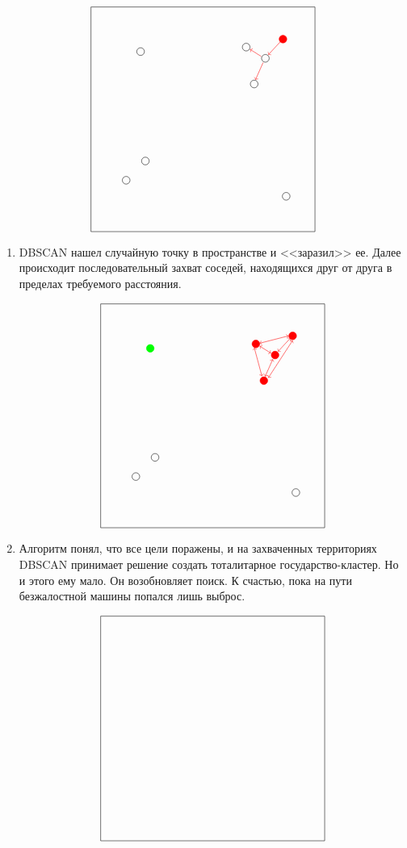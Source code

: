\[
\begin{tikzpicture}
    \draw (-3.5, 3.5) -- (3.5, 3.5);
    \draw (-3.5, -3.5) -- (3.5, -3.5);
    \draw (-3.5, -3.5) -- (-3.5, 3.5);
    \draw (3.5, 3.5) -- (3.5, -3.5);
        
    \draw[red, fill=red] (2.5, 2.5) circle (0.12);
    \draw (1.35, 2.25) circle (0.12);
    \draw (1.6, 1.1) circle (0.12);
    \draw (1.95, 1.9) circle (0.12);
    \draw (-2.4, -1.9) circle (0.12);
    \draw (-1.8, -1.3) circle (0.12);
    \draw (-1.95, 2.11) circle (0.12);
    \draw (2.6, -2.4) circle (0.12);
        
    \draw[->][red] (2.435, 2.435) -- (2.04, 2.01);
    \draw[->][red] (1.88, 1.77) -- (1.64, 1.23);
    \draw[->][red] (1.82, 1.96) -- (1.47, 2.18);
\end{tikzpicture}
\]
\begin{enumerate}
\item DBSCAN нашел случайную точку в пространстве и <<заразил>> ее. Далее происходит последовательный захват соседей, находящихся друг от друга в пределах требуемого расстояния. 

\[
\begin{tikzpicture}
    \draw (-3.5, 3.5) -- (3.5, 3.5);
    \draw (-3.5, -3.5) -- (3.5, -3.5);
    \draw (-3.5, -3.5) -- (-3.5, 3.5);
    \draw (3.5, 3.5) -- (3.5, -3.5);
        
    \draw[red, fill=red] (2.5, 2.5) circle (0.12);
    \draw[red, fill=red] (1.35, 2.25) circle (0.12);
    \draw[red, fill=red] (1.6, 1.1) circle (0.12);
    \draw[red, fill=red] (1.95, 1.9) circle (0.12);
    \draw (-2.4, -1.9) circle (0.12);
    \draw (-1.8, -1.3) circle (0.12);
    \draw[green, fill=green] (-1.95, 2.11) circle (0.12);
    \draw (2.6, -2.4) circle (0.12);
        
    \draw[<->][red] (2.435, 2.435) -- (2.04, 2.01);
    \draw[<->][red] (1.88, 1.77) -- (1.64, 1.23);
    \draw[<->][red] (1.82, 1.96) -- (1.47, 2.18);
    \draw[<->][red] (1.54, 1.24) -- (1.30, 2.13);
    \draw[<->][red] (1.74, 1.19) -- (2.5, 2.36);
    \draw[<->][red] (1.47, 2.27) -- (2.37, 2.5);
\end{tikzpicture}
\]
\item Алгоритм понял, что все цели поражены, и на захваченных территориях DBSCAN принимает решение создать тоталитарное государство-кластер. Но и этого ему мало. Он возобновляет поиск. К счастью, пока на пути безжалостной машины попался лишь выброс.

\[
\begin{tikzpicture}
        \draw (-3.5, 3.5) -- (3.5, 3.5);
        \draw (-3.5, -3.5) -- (3.5, -3.5);
        \draw (-3.5, -3.5) -- (-3.5, 3.5);
        \draw (3.5, 3.5) -- (3.5, -3.5);
        

\end{tikzpicture}\]
\end{enumerate}
